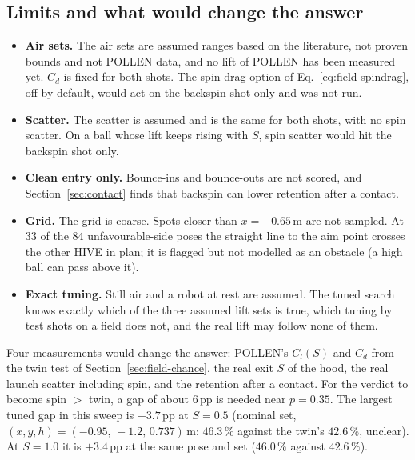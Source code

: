 \subsection{Limits and what would change the answer}
\label{sec:svt-limits}

\begin{itemize}
  \item \textbf{Air sets.} The air sets are assumed ranges based on the literature, not proven bounds and not
    POLLEN data, and no lift of POLLEN has been measured yet. $C_d$ is fixed for both shots. The spin-drag option of Eq.~\eqref{eq:field-spindrag}, off by
    default, would act on the backspin shot only and was not run.
  \item \textbf{Scatter.} The scatter is assumed and is the same for both shots, with no spin scatter. On a ball
    whose lift keeps rising with $S$, spin scatter would hit the backspin shot only.
  \item \textbf{Clean entry only.} Bounce-ins and bounce-outs are not scored, and Section~\ref{sec:contact}
    finds that backspin can lower retention after a contact.
  \item \textbf{Grid.} The grid is coarse. Spots closer than $x=-0.65$\,\unit{m}\assumed{} are not sampled. At
    $33$\derived{} of the $84$ unfavourable-side poses the straight line to the aim point crosses the other
    HIVE in plan; it is flagged but not modelled as an obstacle (a high ball can pass above it).
  \item \textbf{Exact tuning.} Still air and a robot at rest are assumed. The tuned search knows exactly which of
    the three assumed lift sets is true, which tuning by test shots on a field does not, and the real lift may
    follow none of them.
\end{itemize}
Four measurements would change the answer: POLLEN's $C_l(S)$ and $C_d$ from the twin test of
Section~\ref{sec:field-chance}, the real exit $S$ of the hood, the real launch scatter including spin, and the
retention after a contact. For the verdict to become spin $>$ twin, a gap of about $6$\,pp\derived{} is needed
near $p=0.35$\predicted. The largest tuned gap in this sweep is $+3.7$\,pp\predicted{} at $S=0.5$\assumed{}
(nominal set, $(x,y,h)=(-0.95,\,-1.2,\,0.737)$\,\unit{m}\assumed: $46.3\,\%$\predicted{} against the twin's
$42.6\,\%$\predicted, unclear). At $S=1.0$ it is $+3.4$\,pp\predicted{} at the same pose and set
($46.0\,\%$\predicted{} against $42.6\,\%$\predicted).
